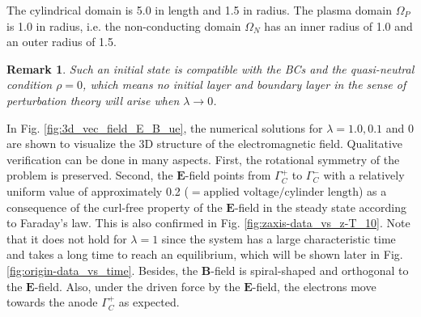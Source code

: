 \documentclass{article}
\newtheorem*{remark}{Remark}
\begin{document}
The cylindrical domain is 5.0 in length and 1.5 in radius. The plasma domain $\Omega_P$ is 1.0 in radius, i.e. the non-conducting domain $\Omega_N$ has an inner radius of 1.0 and an outer radius of 1.5. 

\begin{remark}
    Such an initial state is compatible with the BCs and the quasi-neutral condition $\rho = 0$, which means no initial layer and boundary layer in the sense of perturbation theory will arise when $\lambda \rightarrow 0$. 
\end{remark}

In Fig. \ref{fig:3d_vec_field_E_B_ue}, the numerical solutions for $\lambda = 1.0, 0.1$ and $0$ are shown to visualize the 3D structure of the electromagnetic field. Qualitative verification can be done in many aspects. First, the rotational symmetry of the problem is preserved. Second, the $\mathbf{E}$-field points from $\Gamma^+_C$ to $\Gamma^-_C$ with a relatively uniform value of approximately 0.2 ($=\text{applied voltage}/\text{cylinder length}$) as a consequence of the curl-free property of the $\mathbf{E}$-field in the steady state according to Faraday's law. This is also confirmed in Fig. \ref{fig:zaxis-data_vs_z-T_10}. Note that it does not hold for $\lambda = 1$ since the system has a large characteristic time and takes a long time to reach an equilibrium, which will be shown later in Fig. \ref{fig:origin-data_vs_time}. Besides, the $\mathbf{B}$-field is spiral-shaped and orthogonal to the $\mathbf{E}$-field. Also, under the driven force by the $\mathbf{E}$-field, the electrons move towards the anode $\Gamma^+_C$ as expected.
\end{document}
